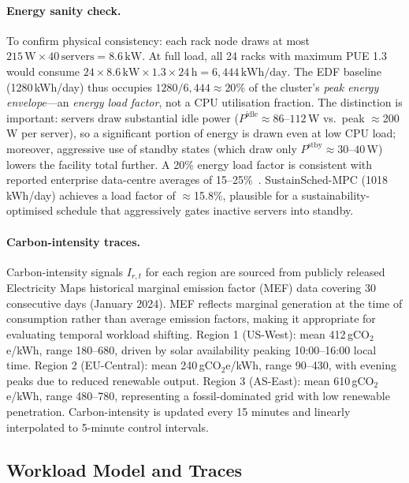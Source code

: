 \documentclass[a4paper,fleqn]{cas-dc}
\begin{document}
\paragraph{Energy sanity check.}
To confirm physical consistency: each rack node draws at most $215\,\text{W}\times40\,\text{servers}=8.6\,\text{kW}$. At full load, all 24 racks with maximum PUE 1.3 would consume $24\times8.6\,\text{kW}\times1.3\times24\,\text{h}=6{,}444\,\text{kWh/day}$. The EDF baseline (1280\,kWh/day) thus occupies $1280/6{,}444\approx20\%$ of the cluster's \emph{peak energy envelope}---an \emph{energy load factor}, not a CPU utilisation fraction. The distinction is important: servers draw substantial idle power ($P^{\mathrm{idle}}\approx86$--$112$\,W vs.\ peak $\approx$200\,W per server), so a significant portion of energy is drawn even at low CPU load; moreover, aggressive use of standby states (which draw only $P^{\mathrm{stby}}\approx30$--$40$\,W) lowers the facility total further. A 20\% energy load factor is consistent with reported enterprise data-centre averages of 15--25\%~\cite{ref-beloglazov-fgcs}. SustainSched-MPC (1018\,kWh/day) achieves a load factor of $\approx$15.8\%, plausible for a sustainability-optimised schedule that aggressively gates inactive servers into standby.

\paragraph{Carbon-intensity traces.}
Carbon-intensity signals $I_{r,t}$ for each region are sourced from publicly released Electricity Maps historical marginal emission factor (MEF) data covering 30 consecutive days (January 2024). MEF reflects marginal generation at the time of consumption rather than average emission factors, making it appropriate for evaluating temporal workload shifting. Region 1 (US-West): mean 412\,gCO$_2$e/kWh, range 180--680, driven by solar availability peaking 10:00--16:00 local time. Region 2 (EU-Central): mean 240\,gCO$_2$e/kWh, range 90--430, with evening peaks due to reduced renewable output. Region 3 (AS-East): mean 610\,gCO$_2$e/kWh, range 480--780, representing a fossil-dominated grid with low renewable penetration. Carbon-intensity is updated every 15 minutes and linearly interpolated to 5-minute control intervals.
\subsection{Workload Model and Traces}
\label{sec:workload_traces}
\end{document}
